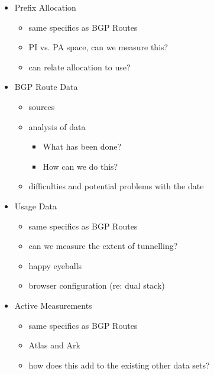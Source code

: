 \begin{itemize}
    \item Prefix Allocation
    \begin{itemize}
        \item same specifics as BGP Routes
        \item PI vs. PA space, can we measure this?
        \item can relate allocation to use?
    \end{itemize}
    \item BGP Route Data
    \begin{itemize}
        \item sources
        \item analysis of data
        \begin{itemize}
            \item What has been done?
            \item How can we do this?
        \end{itemize}
        \item difficulties and potential problems with the date
    \end{itemize}
    \item Usage Data
    \begin{itemize}
        \item same specifics as BGP Routes
        \item can we measure the extent of tunnelling?
        \item happy eyeballs
        \item browser configuration (re: dual stack)
    \end{itemize}
    \item Active Measurements
    \begin{itemize}
        \item same specifics as BGP Routes
        \item Atlas and Ark
        \item how does this add to the existing other data sets?
    \end{itemize}
\end{itemize}
